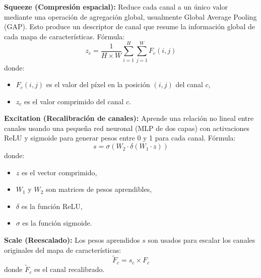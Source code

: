 \begin{itemize}
\textbf{Squeeze (Compresión espacial):}
Reduce cada canal a un único valor mediante una operación de agregación global, usualmente Global Average Pooling (GAP). Esto produce un descriptor de canal que resume la información global de cada mapa de características.
Fórmula:
\begin{equation}\label{eq:squeeze}
    z_c = \frac{1}{H \times W} \sum_{i=1}^{H} \sum_{j=1}^{W} F_c(i,j)
\end{equation}
donde:
\begin{itemize}[label=$\bullet$, leftmargin=1em]
    \item $F_c(i,j)$ es el valor del píxel en la posición $(i,j)$ del canal $c$,
    \item $z_c$ es el valor comprimido del canal $c$.
\end{itemize}

\textbf{Excitation (Recalibración de canales):}
Aprende una relación no lineal entre canales usando una pequeña red neuronal (MLP de dos capas) con activaciones ReLU y sigmoide para generar pesos entre 0 y 1 para cada canal.
Fórmula:
\begin{equation}\label{eq:excitation}
    s = \sigma(W_2 \cdot \delta(W_1 \cdot z))
\end{equation}
donde:
\begin{itemize}[label=$\bullet$, leftmargin=1em]
    \item $z$ es el vector comprimido,
    \item $W_1$ y $W_2$ son matrices de pesos aprendibles,
    \item $\delta$ es la función ReLU,
    \item $\sigma$ es la función sigmoide.
\end{itemize}

\textbf{Scale (Reescalado):}
Los pesos aprendidos $s$ son usados para escalar los canales originales del mapa de características:
\begin{equation}\label{eq:scale}
    \tilde{F}_c = s_c \times F_c
\end{equation}
donde $\tilde{F}_c$ es el canal recalibrado.


\end{itemize}
